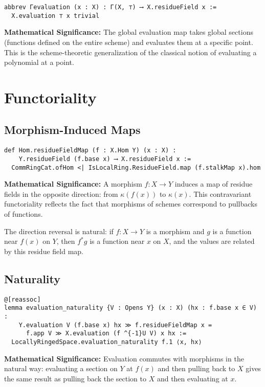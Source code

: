 \documentclass{article}
\theoremstyle{definition}
\begin{document}
\begin{lstlisting}
abbrev Γevaluation (x : X) : Γ(X, ⊤) ⟶ X.residueField x :=
  X.evaluation ⊤ x trivial
\end{lstlisting}

\textbf{Mathematical Significance:} The global evaluation map takes global sections (functions defined on the entire scheme) and evaluates them at a specific point. This is the scheme-theoretic generalization of the classical notion of evaluating a polynomial at a point.

\section{Functoriality}

\subsection{Morphism-Induced Maps}

\begin{lstlisting}
def Hom.residueFieldMap (f : X.Hom Y) (x : X) :
    Y.residueField (f.base x) ⟶ X.residueField x :=
  CommRingCat.ofHom <| IsLocalRing.ResidueField.map (f.stalkMap x).hom
\end{lstlisting}

\textbf{Mathematical Significance:} A morphism $f: X \to Y$ induces a map of residue fields in the opposite direction: from $\kappa(f(x))$ to $\kappa(x)$. This contravariant functoriality reflects the fact that morphisms of schemes correspond to pullbacks of functions.

The direction reversal is natural: if $f: X \to Y$ is a morphism and $g$ is a function near $f(x)$ on $Y$, then $f^*g$ is a function near $x$ on $X$, and the values are related by this residue field map.

\subsection{Naturality}

\begin{lstlisting}
@[reassoc]
lemma evaluation_naturality {V : Opens Y} (x : X) (hx : f.base x ∈ V) :
    Y.evaluation V (f.base x) hx ≫ f.residueFieldMap x =
      f.app V ≫ X.evaluation (f ^{-1}U V) x hx :=
  LocallyRingedSpace.evaluation_naturality f.1 ⟨x, hx⟩
\end{lstlisting}

\textbf{Mathematical Significance:} Evaluation commutes with morphisms in the natural way: evaluating a section on $Y$ at $f(x)$ and then pulling back to $X$ gives the same result as pulling back the section to $X$ and then evaluating at $x$.
\end{document}

